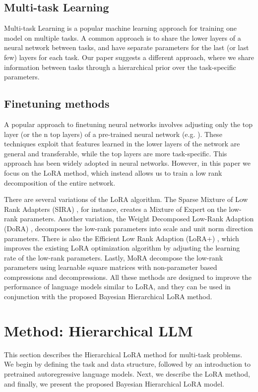 \documentclass[fullpaper]{nldl}
\begin{document}
\subsection{Multi-task Learning}
Multi-task Learning \cite{caruana_multitask_1997} is a popular machine learning approach for training one model on multiple tasks. A common approach is to share the lower layers of a neural network between tasks, and have separate parameters for the last (or last few) layers for each task. Our paper suggests a different approach, where we share information between tasks through a hierarchical prior over the task-specific parameters.

\subsection{Finetuning methods}
A popular approach to finetuning neural networks involves adjusting only the top layer (or the n top layers) of a pre-trained neural network (e.g. \cite{yosinski_how_2014}). These techniques exploit that features learned in the lower layers of the network are general and transferable, while the top layers are more task-specific. This approach has been widely adopted in neural networks. However, in this paper we focus on the LoRA method, which instead allows us to train a low rank decomposition of the entire network.

There are several variations of the LoRA algorithm. The Sparse Mixture of Low Rank Adapters (SIRA) \cite{zhu_sira_2023}, for instance, creates a Mixture of Expert on the low-rank parameters. Another variation, the Weight Decomposed Low-Rank Adaption (DoRA) \cite{hayou_lora_2024}, decomposes the low-rank parameters into scale and unit norm direction parameters. There is also the Efficient Low Rank Adaption (LoRA+) \cite{hayou_lora_2024}, which improves the existing LoRA optimization algorithm by adjusting the learning rate of the low-rank parameters.
Lastly, MoRA \cite{jiang_mora_2024} decompose the low-rank parameters using learnable square matrices with non-parameter based compressions and decompressions.
All these methods are designed to improve the performance of language models similar to LoRA, and they can be used in conjunction with the proposed Bayesian Hierarchical LoRA method.

\section{Method: Hierarchical LLM} \label{sec:method}
This section describes the Hierarchical LoRA method for multi-task problems. 
We begin by defining the task and data structure, followed by an introduction to pretrained autoregressive language models. Next, we describe the LoRA method, and finally, we present the proposed Bayesian Hierarchical LoRA model.
\end{document}

